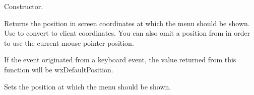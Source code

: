 
Constructor.

\label{wxcontextmenueventgetposition}


Returns the position in screen coordinates at which the menu should be shown. Use  to
convert to client coordinates. You can also omit a position from  in order to use
the current mouse pointer position.

If the event originated from a keyboard event, the value returned from this function will be wxDefaultPosition.

\label{wxcontextmenueventsetposition}


Sets the position at which the menu should be shown.

